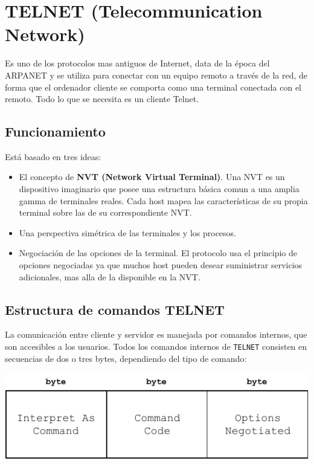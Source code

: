 \section*{TELNET (Telecommunication Network)}
Es uno de los protocolos mas antiguos de Internet, data de la época del ARPANET y se utiliza para conectar con un equipo remoto a través de la red, de forma que el ordenador cliente se comporta como una terminal conectada con el remoto. Todo lo que se necesita es un cliente Telnet.
\subsection*{Funcionamiento}
Está basado en tres ideas:\\
\begin{itemize}
\item El concepto de \textbf{NVT (Network Virtual Terminal)}. Una NVT es un dispositivo imaginario que posee una estructura básica comun a una amplia gamma de terminales reales. Cada host mapea las características de su propia terminal sobre las de su correspondiente NVT.
\item Una perspectiva simétrica de las terminales y los procesos.
\item Negociación de las opciones de la terminal. El protocolo usa el principio de opciones negociadas ya que muchos host pueden desear suministrar servicios adicionales, mas alla de la disponible en la NVT.
\end{itemize}
\subsection*{Estructura de comandos TELNET}
La comunicación entre cliente y servidor es manejada por comandos internos, que son accesibles a los usuarios. Todos los comandos internos de \texttt{TELNET} consisten en secuencias de dos o tres bytes, dependiendo del tipo de comando:

\begin{center}
\includegraphics[page=1,scale=0.75]{TELNET.pdf}
\end{center}

